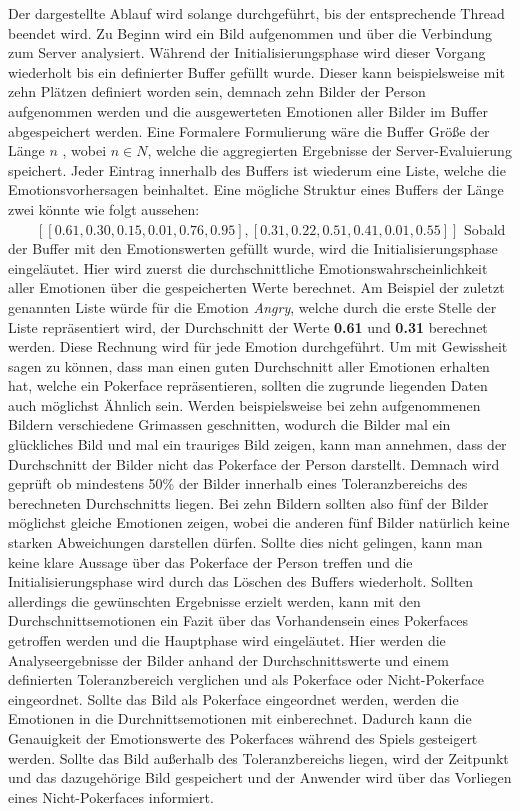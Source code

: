\documentclass[12pt, a4paper]{report}
\begin{document}
Der dargestellte Ablauf wird solange durchgeführt, bis der entsprechende Thread beendet wird. Zu Beginn wird ein Bild aufgenommen und über die Verbindung zum Server analysiert. Während der Initialisierungsphase wird dieser Vorgang wiederholt bis ein definierter Buffer gefüllt wurde. Dieser kann beispielsweise mit zehn Plätzen definiert worden sein, demnach zehn Bilder der Person aufgenommen werden und die ausgewerteten Emotionen aller Bilder im Buffer abgespeichert werden. Eine Formalere Formulierung wäre die Buffer Größe der Länge $ n $  , wobei $ n \in N $, welche die aggregierten Ergebnisse der Server-Evaluierung speichert. Jeder Eintrag innerhalb des Buffers ist wiederum eine Liste, welche die Emotionsvorhersagen beinhaltet. Eine mögliche Struktur eines Buffers der Länge zwei könnte wie folgt aussehen: $ \qquad[ [0.61, 0.30, 0.15, 0.01, 0.76, 0.95] , [0.31, 0.22, 0.51, 0.41, 0.01, 0.55] ] $
Sobald der Buffer mit den Emotionswerten gefüllt wurde, wird die Initialisierungsphase eingeläutet. Hier wird zuerst die durchschnittliche Emotionswahrscheinlichkeit aller Emotionen über die gespeicherten Werte berechnet. Am Beispiel der zuletzt genannten Liste würde für die Emotion \textit{Angry}, welche durch die erste Stelle der Liste repräsentiert wird, der Durchschnitt der Werte \textbf{0.61} und \textbf{0.31} berechnet werden. Diese Rechnung wird für jede Emotion durchgeführt. 
\newline
Um mit Gewissheit sagen zu können, dass man einen guten Durchschnitt aller Emotionen erhalten hat, welche ein Pokerface repräsentieren, sollten die zugrunde liegenden Daten auch möglichst Ähnlich sein. Werden beispielsweise bei zehn aufgenommenen Bildern verschiedene Grimassen geschnitten, wodurch die Bilder mal ein glückliches Bild und mal ein trauriges Bild zeigen, kann man annehmen, dass der Durchschnitt der Bilder nicht das Pokerface der Person darstellt. Demnach wird geprüft ob mindestens 50\% der Bilder innerhalb eines Toleranzbereichs des berechneten Durchschnitts liegen. Bei zehn Bildern sollten also fünf der Bilder möglichst gleiche Emotionen zeigen, wobei die anderen fünf Bilder natürlich keine starken Abweichungen darstellen dürfen.
Sollte dies nicht gelingen, kann man keine klare Aussage über das Pokerface der Person treffen und die Initialisierungsphase wird durch das Löschen des Buffers wiederholt.
Sollten allerdings die gewünschten Ergebnisse erzielt werden, kann mit den Durchschnittsemotionen ein Fazit über das Vorhandensein eines Pokerfaces getroffen werden und die Hauptphase wird eingeläutet. Hier werden die Analyseergebnisse der Bilder anhand der Durchschnittswerte und einem definierten Toleranzbereich verglichen und als Pokerface oder Nicht-Pokerface eingeordnet. Sollte das Bild als Pokerface eingeordnet werden, werden die Emotionen in die Durchnittsemotionen mit einberechnet. Dadurch kann die Genauigkeit der Emotionswerte des Pokerfaces während des Spiels gesteigert werden. Sollte das Bild außerhalb des Toleranzbereichs liegen, wird der Zeitpunkt und das dazugehörige Bild gespeichert und der Anwender wird über das Vorliegen eines Nicht-Pokerfaces informiert.
\end{document}
